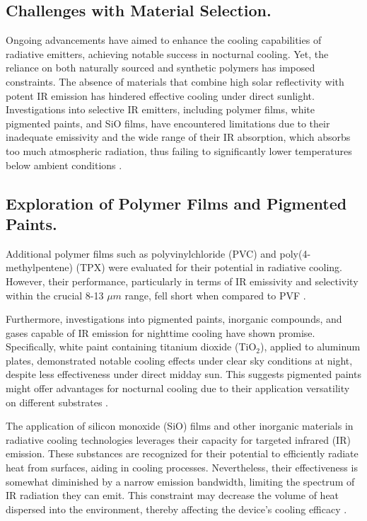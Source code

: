 \subsection{Challenges with Material Selection.}
Ongoing advancements have aimed to enhance the cooling capabilities of radiative emitters, achieving notable success in nocturnal cooling. Yet, the reliance on both naturally sourced and synthetic polymers has imposed constraints. The absence of materials that combine high solar reflectivity with potent IR emission has hindered effective cooling under direct sunlight. Investigations into selective IR emitters, including polymer films, white pigmented paints, and SiO films, have encountered limitations due to their inadequate emissivity and the wide range of their IR absorption, which absorbs too much atmospheric radiation, thus failing to significantly lower temperatures below ambient conditions \cite{hossain_radiative_2016}.

\subsection{Exploration of Polymer Films and Pigmented Paints.}
Additional polymer films such as polyvinylchloride (PVC) and poly(4-methylpentene) (TPX) were evaluated for their potential in radiative cooling. However, their performance, particularly in terms of IR emissivity and selectivity within the crucial 8-13 $\mu m$ range, fell short when compared to PVF \cite{hossain_radiative_2016}.

Furthermore, investigations into pigmented paints, inorganic compounds, and gases capable of IR emission for nighttime cooling have shown promise. Specifically, white paint containing titanium dioxide (TiO$_2$), applied to aluminum plates, demonstrated notable cooling effects under clear sky conditions at night, despite less effectiveness under direct midday sun. This suggests pigmented paints might offer advantages for nocturnal cooling due to their application versatility on different substrates \cite{hossain_radiative_2016}.

The application of silicon monoxide (SiO) films and other inorganic materials in radiative cooling technologies leverages their capacity for targeted infrared (IR) emission. These substances are recognized for their potential to efficiently radiate heat from surfaces, aiding in cooling processes. Nevertheless, their effectiveness is somewhat diminished by a narrow emission bandwidth, limiting the spectrum of IR radiation they can emit. This constraint may decrease the volume of heat dispersed into the environment, thereby affecting the device's cooling efficacy \cite{hossain_radiative_2016}.

